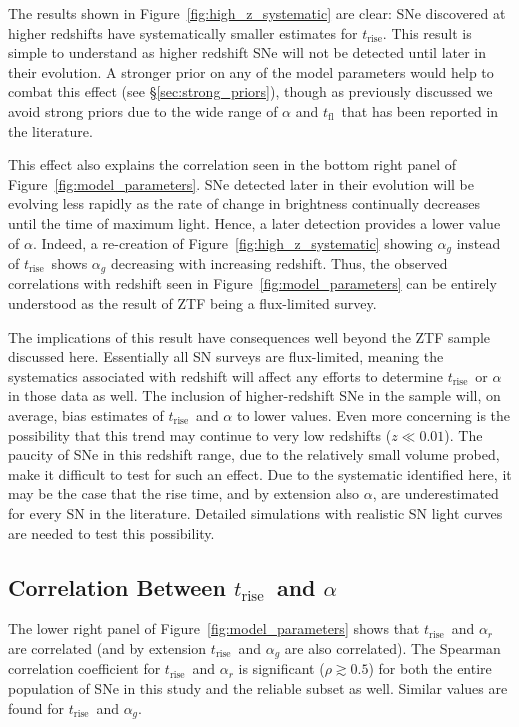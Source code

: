 \documentclass[twocolumn]{./aastex63}
\newcommand{\tfl}{$t_\mathrm{fl}$}
\newcommand{\trise}{$t_\mathrm{rise}$}
\begin{document}
The results shown in Figure~\ref{fig:high_z_systematic} are clear: SNe
discovered at higher redshifts have systematically smaller estimates for
\trise. This result is simple to understand as higher redshift SNe will not be
detected until later in their evolution. A stronger prior on any of the model
parameters would help to combat this effect (see \S\ref{sec:strong_priors}),
though as previously discussed we avoid strong priors due to the wide range of
$\alpha$ and \tfl\ that has been reported in the literature. 

This effect also explains the correlation seen in the bottom right panel of
Figure~\ref{fig:model_parameters}. SNe detected later in their evolution will
be evolving less rapidly as the rate of change in brightness continually
decreases until the time of maximum light. Hence, a later detection provides a
lower value of $\alpha$. Indeed, a re-creation of
Figure~\ref{fig:high_z_systematic} showing $\alpha_g$ instead of \trise\ shows
$\alpha_g$ decreasing with increasing redshift. Thus, the observed
correlations with redshift seen in Figure~\ref{fig:model_parameters} can be
entirely understood as the result of ZTF being a flux-limited survey.

The implications of this result have consequences well beyond the ZTF sample
discussed here. Essentially all SN surveys are flux-limited, meaning the
systematics associated with redshift will affect any efforts to determine
\trise\ or $\alpha$ in those data as well. The inclusion of higher-redshift
SNe in the sample will, on average, bias estimates of \trise\ and $\alpha$ to
lower values. Even more concerning is the possibility that this trend may
continue to very low redshifts ($z \ll 0.01$). The paucity of SNe in this
redshift range, due to the relatively small volume probed, make it difficult
to test for such an effect. Due to the systematic identified here, it may be
the case that the rise time, and by extension also $\alpha$, are
underestimated for every SN in the literature. Detailed simulations with
realistic SN light curves are needed to test this possibility.

\subsection{Correlation Between \trise\ and $\alpha$}

The lower right panel of Figure~\ref{fig:model_parameters} shows that \trise\
and $\alpha_r$ are correlated (and by extension \trise\ and $\alpha_g$ are
also correlated). The Spearman correlation coefficient for \trise\ and
$\alpha_r$ is significant ($\rho \gtrsim 0.5$) for both the entire population
of SNe in this study and the reliable subset as well. Similar values are found
for \trise\ and $\alpha_g$.
\end{document}
